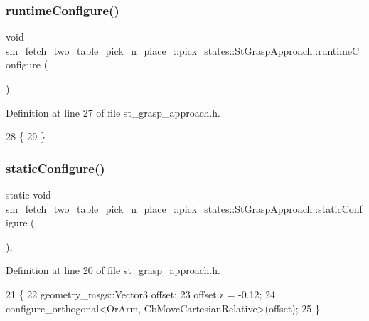 \subsubsection{\texorpdfstring{runtime\+Configure()}{runtimeConfigure()}}
{\footnotesize\ttfamily void sm\+\_\+fetch\+\_\+two\+\_\+table\+\_\+pick\+\_\+n\+\_\+place\+\_\+::pick\+\_\+states\+::\+St\+Grasp\+Approach\+::runtime\+Configure (\begin{DoxyParamCaption}{ }\end{DoxyParamCaption})\hspace{0.3cm}{\ttfamily [inline]}}



Definition at line 27 of file st\+\_\+grasp\+\_\+approach.\+h.


\begin{DoxyCode}
28     \{
29     \}
\end{DoxyCode}
\mbox{\label{structsm__fetch__two__table__pick__n__place__1_1_1pick__states_1_1StGraspApproach_a70fabd4dbbb1a0e9ea1c3e9d17cb7a39}} 
\subsubsection{\texorpdfstring{static\+Configure()}{staticConfigure()}}
{\footnotesize\ttfamily static void sm\+\_\+fetch\+\_\+two\+\_\+table\+\_\+pick\+\_\+n\+\_\+place\+\_\+::pick\+\_\+states\+::\+St\+Grasp\+Approach\+::static\+Configure (\begin{DoxyParamCaption}{ }\end{DoxyParamCaption})\hspace{0.3cm}{\ttfamily [inline]}, {\ttfamily [static]}}



Definition at line 20 of file st\+\_\+grasp\+\_\+approach.\+h.


\begin{DoxyCode}
21     \{
22         geometry\_msgs::Vector3 offset;
23         offset.z = -0.12;
24         configure\_orthogonal<OrArm, CbMoveCartesianRelative>(offset);
25     \}
\end{DoxyCode}


